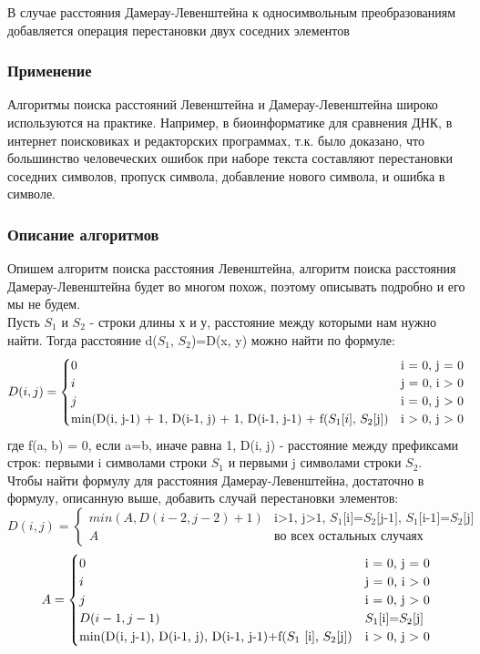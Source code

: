 \documentclass[12pt, a4paper]{article}
\begin{document}
В случае расстояния  Дамерау-Левенштейна к 
односимвольным преобразованиям добавляется операция
перестановки двух соседних элементов
\subsubsection{Применение}
Алгоритмы поиска расстояний Левенштейна и
Дамерау-Левенштейна широко используются на
практике. Например, в биоинформатике для сравнения
ДНК, в интернет поисковиках и редакторских
программах, т.к. было доказано, что большинство
человеческих ошибок при наборе текста составляют 
перестановки соседних символов, пропуск символа,
добавление нового символа, и ошибка в символе.
 \subsubsection{Описание алгоритмов}
 Опишем алгоритм поиска расстояния Левенштейна,
 алгоритм поиска расстояния 
 Дамерау-Левенштейна будет во многом похож,
 поэтому описывать подробно и его мы не будем.\\
 Пусть $S_{1}$ и $S_{2}$ - строки длины х и у,
 расстояние между которыми нам нужно найти. Тогда
 расстояние d($S_{1}$, $S_{2}$)=D(x, y) можно найти
 по формуле:
 \begin{equation*}
D(i, j) = 
 \begin{cases}
   0 &\text{i = 0, j = 0}\\
   i &\text{j = 0, i > 0}\\
   j &\text{i = 0, j > 0}\\
   $min(D(i, j-1) + 1, D(i-1, j) + 1, D(i-1, 
   j-1) + f($S_{1}
   [i]$, $S_{2}$[j])$ &\text{i > 0, j > 0}\\
 \end{cases}
\end{equation*}
где f(a, b) = 0, если a=b, иначе равна 1, D(i, j) - 
расстояние между префиксами строк: первыми i
 символами строки $S_{1}$
 и первыми j
 символами строки $S_{2}$.\\
Чтобы найти формулу для расстояния  
Дамерау-Левенштейна, достаточно в формулу,
описанную выше, добавить случай перестановки
элементов:
\begin{equation*}
D(i, j) = 
 \begin{cases}
   min(A,D(i-2,j-2)+1) &\text{i>1, j>1, $S_{1}$
   [i]=$S_{2}$[j-1], $S_{1}$[i-1]=$S_{2}$[j]}\\ 
   A &\text{во всех остальных случаях}
 \end{cases}
\end{equation*}
\begin{equation*}
A = 
 \begin{cases}
   0 &\text{i = 0, j = 0}\\
   i &\text{j = 0, i > 0}\\
   j &\text{i = 0, j > 0}\\
   D(i-1,j-1) &\text{$S_{1}$[i]=$S_{2}$[j]}\\
   $min(D(i, j-1), D(i-1, j), D(i-1, j-1)+f($S_{1}$
   [i], $S_{2}$[j])$ &\text{i > 0, j > 0}\\
 \end{cases}
\end{equation*}
\end{document}
